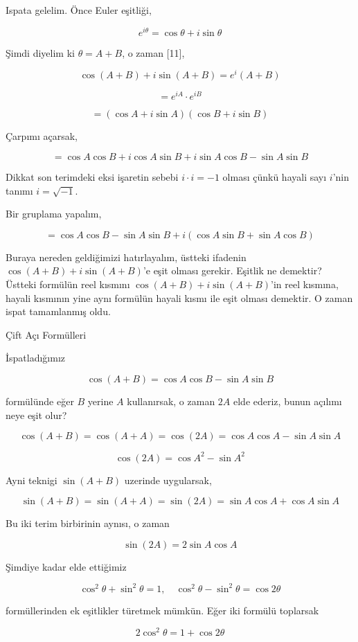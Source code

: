 \documentclass[12pt,fleqn]{article}\usepackage{../../common}
\begin{document}
Ispata gelelim. Önce Euler eşitliği,

$$
e^{i\theta} = \cos\theta + i\sin\theta
$$

Şimdi diyelim ki $\theta = A+B$, o zaman [11],

$$
\cos(A+B) + i\sin(A+B) = e^i(A+B)
$$

$$
= e^{iA} \cdot e^{iB}
$$

$$
= (\cos A + i\sin A) (\cos B + i\sin B)
$$

Çarpımı açarsak,

$$
= \cos A \cos B + i\cos A \sin B +
i\sin A \cos B - \sin A \sin B
$$

Dikkat son terimdeki eksi işaretin sebebi $i \cdot i = -1$ olması çünkü hayali
sayı $i$'nin tanımı $i = \sqrt{-1}$. 

Bir gruplama yapalım, 

$$
= \cos A \cos B - \sin A \sin B + i (\cos A \sin B + \sin A \cos B )
$$

Buraya nereden geldiğimizi hatırlayalım, üstteki ifadenin $\cos(A+B) + i\sin(A+B)$'e
eşit olması gerekir. Eşitlik ne demektir? Üstteki formülün reel kısmını
$\cos(A+B) + i\sin(A+B)$'in reel kısmına, hayali kısmının yine aynı formülün
hayali kısmı ile eşit olması demektir. O zaman ispat tamamlanmış oldu.

Çift Açı Formülleri

İspatladığımız

$$
\cos(A+B) = \cos A \cos B - \sin A \sin B
$$

formülünde eğer $B$ yerine $A$ kullanırsak, o zaman $2A$ elde ederiz, bunun
açılımı neye eşit olur?

$$
\cos(A+B) = \cos(A+A) = \cos(2A) = \cos A \cos A - \sin A \sin A
$$

$$
\cos(2A) = \cos A^2 - \sin A^2
$$

Ayni teknigi $\sin(A+B)$ uzerinde uygularsak,

$$
\sin(A+B) = \sin(A+A) = \sin(2A) =
\sin A \cos A + \cos A \sin A
$$

Bu iki terim birbirinin aynısı, o zaman

$$
\sin(2A) = 2\sin A \cos A
$$

Şimdiye kadar elde ettiğimiz

$$
\cos^2\theta + \sin^2\theta = 1, \quad
\cos^2\theta - \sin^2\theta = \cos2\theta
$$

formüllerinden ek eşitlikler türetmek mümkün. Eğer iki formülü toplarsak

$$
2\cos^2\theta = 1 + \cos2\theta 
$$
\end{document}
